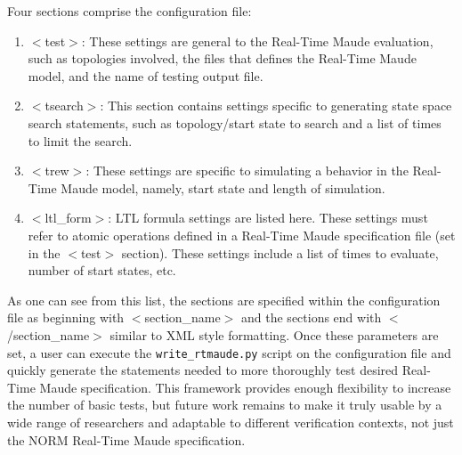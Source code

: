 \documentclass[10pt, journal]{IEEEtran}
\begin{document}
Four sections comprise the configuration file:
\begin{enumerate}
	\item $<$test$>$: These settings are general to the Real-Time Maude evaluation, such as topologies involved, the files that defines the Real-Time Maude model, and the name of testing output file.
	\item$<$tsearch$>$: This section contains settings specific to generating state space search statements, such as topology/start state to search and a list of times to limit the search.
	\item $<$trew$>$: These settings are specific to simulating a behavior in the Real-Time Maude model, namely, start state and length of simulation.
	\item $<$ltl\_form$>$: LTL formula settings are listed here. These settings must refer to atomic operations defined in a Real-Time Maude specification file (set in the $<$test$>$ section). These settings include a list of times to evaluate, number of start states, etc.
\end{enumerate}
As one can see from this list, the sections are specified within the configuration file as beginning with $<$section\_name$>$ and the sections end with $<$/section\_name$>$ similar to XML style formatting. Once these parameters are set, a user can execute the \texttt{write\_rtmaude.py} script on the configuration file and quickly generate the statements needed to more thoroughly test desired Real-Time Maude specification. This framework provides enough flexibility to increase the number of basic tests, but future work remains to make it truly usable by a wide range of researchers and adaptable to different verification contexts, not just the NORM Real-Time Maude specification.
\end{document}
